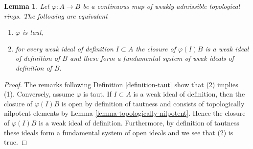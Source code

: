 \documentclass{stacks-project}
\theoremstyle{plain}
\newtheorem{lemma}[subsection]{Lemma}
\theoremstyle{definition}
\theoremstyle{remark}
\numberwithin{equation}{subsection}
\begin{document}
\begin{lemma}
\label{lemma-taut-weakly-admissible}
Let $\varphi : A \to B$ be a continuous map of weakly admissible topological
rings. The following are equivalent
\begin{enumerate}
\item $\varphi$ is taut,
\item for every weak ideal of definition $I \subset A$ the closure of
$\varphi(I)B$ is a weak ideal of definition of $B$ and these form a
fundamental system of weak ideals of definition of $B$.
\end{enumerate}
\end{lemma}

\begin{proof}
The remarks following Definition \ref{definition-taut} show that
(2) implies (1). Conversely, assume $\varphi$ is taut. If $I \subset A$
is a weak ideal of definition, then the closure of $\varphi(I)B$
is open by definition of tautness and consists of topologically
nilpotent elements by Lemma \ref{lemma-topologically-nilpotent}.
Hence the closure of $\varphi(I)B$ is a weak ideal of definition.
Furthermore, by definition of tautness these ideals form a
fundamental system of open ideals and we see that (2) is true.
\end{proof}
\end{document}
